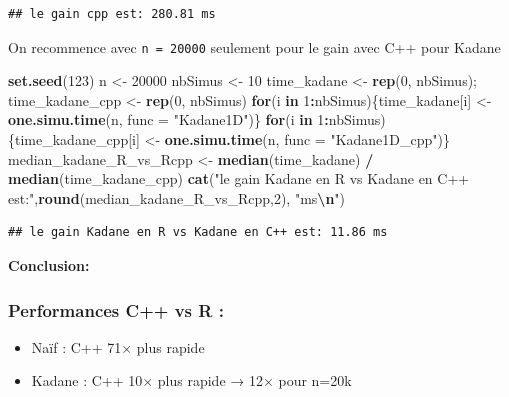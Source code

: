 \documentclass[
]{article}
\newenvironment{Shaded}{\begin{snugshade}}{\end{snugshade}}
\newcommand{\AttributeTok}[1]{\textcolor[rgb]{0.13,0.29,0.53}{#1}}
\newcommand{\ControlFlowTok}[1]{\textcolor[rgb]{0.13,0.29,0.53}{\textbf{#1}}}
\newcommand{\DecValTok}[1]{\textcolor[rgb]{0.00,0.00,0.81}{#1}}
\newcommand{\FunctionTok}[1]{\textcolor[rgb]{0.13,0.29,0.53}{\textbf{#1}}}
\newcommand{\NormalTok}[1]{#1}
\newcommand{\OtherTok}[1]{\textcolor[rgb]{0.56,0.35,0.01}{#1}}
\newcommand{\SpecialCharTok}[1]{\textcolor[rgb]{0.81,0.36,0.00}{\textbf{#1}}}
\newcommand{\StringTok}[1]{\textcolor[rgb]{0.31,0.60,0.02}{#1}}
\providecommand{\tightlist}{%
  \setlength{\itemsep}{0pt}\setlength{\parskip}{0pt}}
\begin{document}
\begin{verbatim}
## le gain cpp est: 280.81 ms
\end{verbatim}

On recommence avec \texttt{n\ =\ 20000} seulement pour le gain avec C++
pour Kadane

\begin{Shaded}
\begin{Highlighting}[]
\FunctionTok{set.seed}\NormalTok{(}\DecValTok{123}\NormalTok{)}
\NormalTok{n }\OtherTok{\textless{}{-}} \DecValTok{20000}
\NormalTok{nbSimus }\OtherTok{\textless{}{-}} \DecValTok{10}
\NormalTok{time\_kadane }\OtherTok{\textless{}{-}} \FunctionTok{rep}\NormalTok{(}\DecValTok{0}\NormalTok{, nbSimus); time\_kadane\_cpp }\OtherTok{\textless{}{-}} \FunctionTok{rep}\NormalTok{(}\DecValTok{0}\NormalTok{, nbSimus)}
\ControlFlowTok{for}\NormalTok{(i }\ControlFlowTok{in} \DecValTok{1}\SpecialCharTok{:}\NormalTok{nbSimus)\{time\_kadane[i] }\OtherTok{\textless{}{-}} \FunctionTok{one.simu.time}\NormalTok{(n, }\AttributeTok{func =} \StringTok{"Kadane1D"}\NormalTok{)\}}
\ControlFlowTok{for}\NormalTok{(i }\ControlFlowTok{in} \DecValTok{1}\SpecialCharTok{:}\NormalTok{nbSimus)\{time\_kadane\_cpp[i] }\OtherTok{\textless{}{-}} \FunctionTok{one.simu.time}\NormalTok{(n, }\AttributeTok{func =} \StringTok{"Kadane1D\_cpp"}\NormalTok{)\}}
\NormalTok{median\_kadane\_R\_vs\_Rcpp }\OtherTok{\textless{}{-}} \FunctionTok{median}\NormalTok{(time\_kadane) }\SpecialCharTok{/} \FunctionTok{median}\NormalTok{(time\_kadane\_cpp)}
\FunctionTok{cat}\NormalTok{(}\StringTok{"le gain Kadane en R vs Kadane en C++ est:"}\NormalTok{,}\FunctionTok{round}\NormalTok{(median\_kadane\_R\_vs\_Rcpp,}\DecValTok{2}\NormalTok{), }\StringTok{"ms}\SpecialCharTok{\textbackslash{}n}\StringTok{"}\NormalTok{)}
\end{Highlighting}
\end{Shaded}

\begin{verbatim}
## le gain Kadane en R vs Kadane en C++ est: 11.86 ms
\end{verbatim}

\textbf{Conclusion:}

\subsubsection{Performances C++ vs R :}\label{performances-c-vs-r}

\begin{itemize}
\tightlist
\item
  Naïf : C++ 71× plus rapide\\
\item
  Kadane : C++ 10× plus rapide → 12× pour n=20k
\end{itemize}
\end{document}
